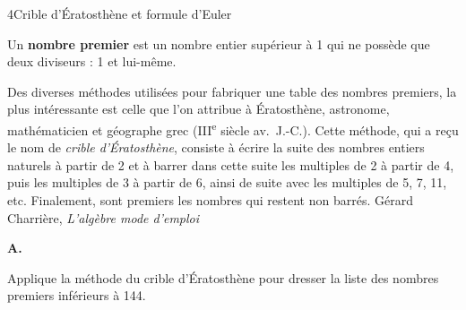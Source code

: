 \begin{exercice}{4}{Crible d'Ératosthène et formule d'Euler}

\begin{mdframed}[backgroundcolor=vlmgray, innerleftmargin=10pt, innerrightmargin=10pt, innertopmargin=6pt, innerbottommargin=6pt, skipabove=-5pt, skipbelow=5pt]
Un \textbf{nombre premier} est un nombre entier supérieur à 1 qui ne possède que deux diviseurs : 1 et lui-même.
\end{mdframed}


\medskip
{\footnotesize Des diverses méthodes utilisées pour fabriquer une table des nombres premiers, la plus intéressante est celle que l'on attribue à Ératosthène, astronome, mathématicien et géographe grec (III\textsuperscript{e} siècle av.\ J.-C.). Cette méthode, qui a reçu le nom de \textit{crible d'Ératosthène}, consiste à écrire la suite des nombres entiers naturels à partir de 2 et à barrer dans cette suite les multiples de 2 à partir de 4, puis les multiples de 3 à partir de 6, ainsi de suite avec les multiples de 5, 7, 11, etc. Finalement, sont premiers les nombres qui restent non barrés. \hfill Gérard Charrière, \textit{L'algèbre mode d'emploi}}

\vfill
\textbf{A.}

\medskip
Applique la méthode du crible d'Ératosthène pour dresser la liste des nombres premiers inférieurs à 144.


\end{exercice}
